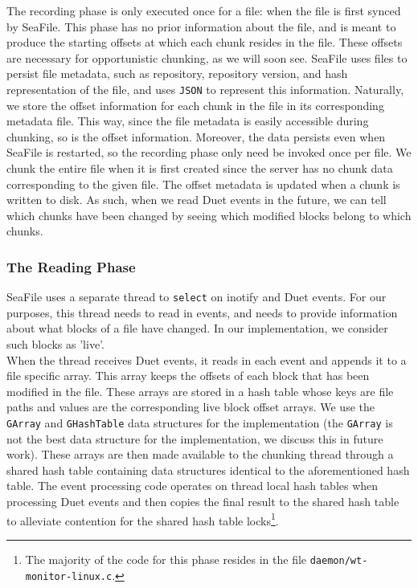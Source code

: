 \documentclass[table]{article}
\newcommand{\code}[1]{\texttt{#1}}
\begin{document}
\begin{multicols}{2}
The recording phase is only executed once for a file: when the file is first synced by SeaFile. This phase has no prior information about the file, and is meant to produce the starting offsets at which each chunk resides in the file. These offsets are necessary for opportunistic chunking, as we will soon see. SeaFile uses files to persist file metadata, such as repository, repository version, and hash representation of the file, and uses \code{JSON} to represent this information. Naturally, we store the offset information for each chunk in the file in its corresponding metadata file. This way, since the file metadata is easily accessible during chunking, so is the offset information. Moreover, the data persists even when SeaFile is restarted, so the recording phase only need be invoked once per file. We chunk the entire file when it is first created since the server has no chunk data corresponding to the given file. The offset metadata is updated when a chunk is written to disk. As such, when we read Duet events in the future, we can tell which chunks have been changed by seeing which modified blocks belong to which chunks.

\subsubsection{The Reading Phase}

SeaFile uses a separate thread to \code{select} on inotify and Duet events. For our purposes, this thread needs to read in events, and needs to provide information about what blocks of a file have changed. In our implementation, we consider such blocks as 'live'.\\

When the thread receives Duet events, it reads in each event and appends it to a file specific array. This array keeps the offsets of each block that has been modified in the file. These arrays are stored in a hash table whose keys are file paths and values are the corresponding live block offset arrays. We use the \code{GArray} and \code{GHashTable} data structures for the implementation (the \code{GArray} is not the best data structure for the implementation, we discuss this in future work). These arrays are then made available to the chunking thread through a shared hash table containing data structures identical to the aforementioned hash table. The event processing code operates on thread local hash tables when processing Duet events and then copies the final result to the shared hash table to alleviate contention for the shared hash table locks\footnote{The majority of the code for this phase resides in the file \code{daemon/wt-monitor-linux.c}.}.\\


\end{multicols}
\end{document}
